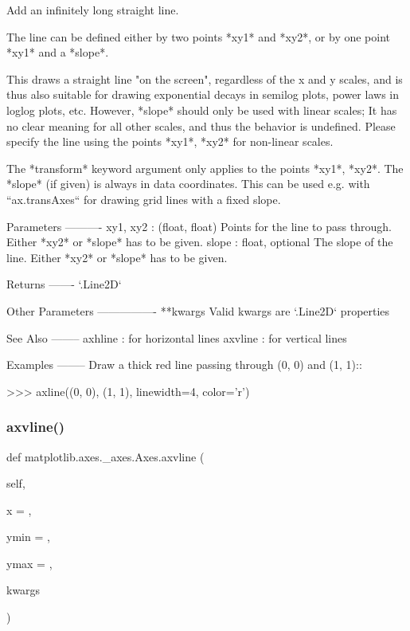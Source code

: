 \begin{DoxyVerb}Add an infinitely long straight line.

The line can be defined either by two points *xy1* and *xy2*, or
by one point *xy1* and a *slope*.

This draws a straight line "on the screen", regardless of the x and y
scales, and is thus also suitable for drawing exponential decays in
semilog plots, power laws in loglog plots, etc. However, *slope*
should only be used with linear scales; It has no clear meaning for
all other scales, and thus the behavior is undefined. Please specify
the line using the points *xy1*, *xy2* for non-linear scales.

The *transform* keyword argument only applies to the points *xy1*,
*xy2*. The *slope* (if given) is always in data coordinates. This can
be used e.g. with ``ax.transAxes`` for drawing grid lines with a fixed
slope.

Parameters
----------
xy1, xy2 : (float, float)
    Points for the line to pass through.
    Either *xy2* or *slope* has to be given.
slope : float, optional
    The slope of the line. Either *xy2* or *slope* has to be given.

Returns
-------
`.Line2D`

Other Parameters
----------------
**kwargs
    Valid kwargs are `.Line2D` properties


See Also
--------
axhline : for horizontal lines
axvline : for vertical lines

Examples
--------
Draw a thick red line passing through (0, 0) and (1, 1)::

    >>> axline((0, 0), (1, 1), linewidth=4, color='r')
\end{DoxyVerb}
 \mbox{\label{classmatplotlib_1_1axes_1_1__axes_1_1Axes_a1d82d7a20cc9e11ef558b1fd852f901f}} 
\subsubsection{\texorpdfstring{axvline()}{axvline()}}
{\footnotesize\ttfamily def matplotlib.\+axes.\+\_\+axes.\+Axes.\+axvline (\begin{DoxyParamCaption}\item[{}]{self,  }\item[{}]{x = {},  }\item[{}]{ymin = {},  }\item[{}]{ymax = {},  }\item[{}]{kwargs }\end{DoxyParamCaption})}

